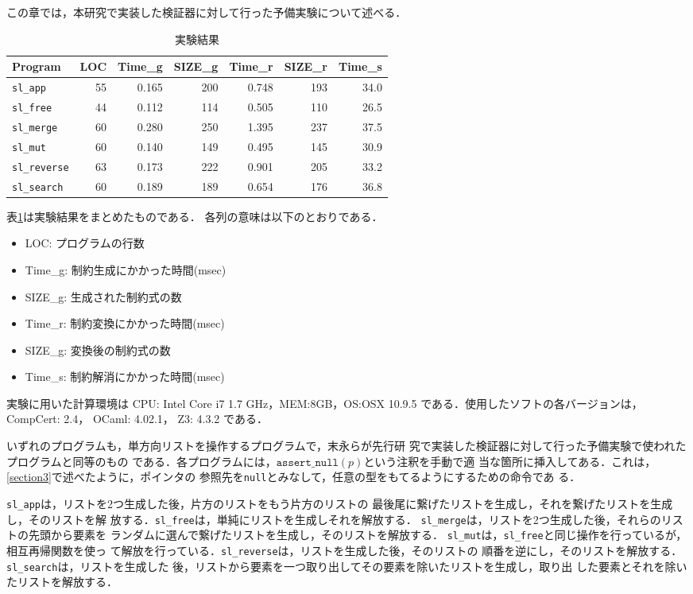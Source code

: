 この章では，本研究で実装した検証器に対して行った予備実験について述べる．

\begin{table}[htbp]
  \footnotesize
  \centering
  \caption{実験結果}
  \label{ex_table}
  \begin{tabular}[tb]{|l|r|r|r|r|r|r|}
    \hline
    Program & LOC & Time\_g & SIZE\_g & Time\_r & SIZE\_r & Time\_s \\ \hline\hline
    \verb|sl_app| & 55 & 0.165 & 200 & 0.748 & 193 &  34.0 \\ \hline
    \verb|sl_free| & 44 & 0.112 & 114 & 0.505 & 110 & 26.5 \\ \hline
    \verb|sl_merge| & 60 & 0.280 & 250 & 1.395 & 237 & 37.5 \\ \hline
    \verb|sl_mut| & 60 & 0.140 & 149 & 0.495 & 145 & 30.9 \\ \hline
    \verb|sl_reverse| & 63 & 0.173 & 222 & 0.901 & 205 & 33.2 \\ \hline
    \verb|sl_search| & 60 & 0.189 & 189 & 0.654 & 176 & 36.8 \\ \hline
  \end{tabular}
\end{table}

表\ref{ex_table}は実験結果をまとめたものである．
各列の意味は以下のとおりである．
\begin{itemize}
  \item LOC: プログラムの行数
  \item Time\_g: 制約生成にかかった時間(msec)
  \item SIZE\_g: 生成された制約式の数
  \item Time\_r: 制約変換にかかった時間(msec)
  \item SIZE\_g: 変換後の制約式の数
  \item Time\_s: 制約解消にかかった時間(msec)
\end{itemize}

実験に用いた計算環境は CPU: Intel Core i7 1.7 GHz，MEM:8GB，OS:OSX
10.9.5 である．使用したソフトの各バージョンは，CompCert: 2.4， OCaml:
4.02.1， Z3: 4.3.2 である．

いずれのプログラムも，単方向リストを操作するプログラムで，末永らが先行研
究で実装した検証器に対して行った予備実験で使われたプログラムと同等のもの
である．各プログラムには，$\texttt{assert\_null}(p)$という注釈を手動で適
当な箇所に挿入してある．これは，\ref{section3}で述べたように，ポインタの
参照先を\texttt{null}とみなして，任意の型をもてるようにするための命令であ
る．

\verb|sl_app|は，リストを2つ生成した後，片方のリストをもう片方のリストの
最後尾に繋げたリストを生成し，それを繋げたリストを生成し，そのリストを解
放する．\verb|sl_free|は，単純にリストを生成しそれを解放する．
\verb|sl_merge|は，リストを2つ生成した後，それらのリストの先頭から要素を
ランダムに選んで繋げたリストを生成し，そのリストを解放する．
\verb|sl_mut|は，\verb|sl_free|と同じ操作を行っているが，相互再帰関数を使っ
て解放を行っている．\verb|sl_reverse|は，リストを生成した後，そのリストの
順番を逆にし，そのリストを解放する．\verb|sl_search|は，リストを生成した
後，リストから要素を一つ取り出してその要素を除いたリストを生成し，取り出
した要素とそれを除いたリストを解放する．

